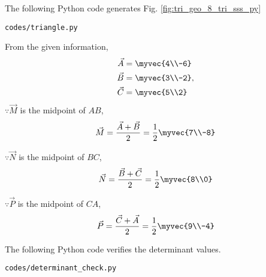 The  following Python code generates Fig. \ref{fig:tri_geo_8_tri_sss_py}
%
\begin{lstlisting}
codes/triangle.py
\end{lstlisting}
From the given information, 
\begin{align}
\label{eq:tri_geo_8_constr_a}
\vec{A} &= \myvec{4\\-6} 
\\
\vec{B} &= \myvec{3\\-2}, 
\label{eq:tri_geo_8_constr_b}
\\
\vec{C} &= \myvec{5\\2}
\label{eq:tri_geo_8_constr_c}
\end{align}
$\because \vec{M}$ is the midpoint of $AB$,
\begin{align}
\vec{M}= \frac{\vec{A}+\vec{B}}{2} = \frac{1}{2}\myvec{7\\-8}
\label{eq:tri_geo_8_constr_m}
\end{align}

$\because \vec{N}$ is the midpoint of $BC$,
\begin{align}
\vec{N}= \frac{\vec{B}+\vec{C}}{2} = \frac{1}{2}\myvec{8\\0}
\label{eq:tri_geo_8_constr_n}
\end{align}

$\because \vec{P}$ is the midpoint of $CA$,
\begin{align}
\vec{P}= \frac{\vec{C}+\vec{A}}{2} = \frac{1}{2}\myvec{9\\-4}
\label{eq:tri_geo_8_constr_p}
\end{align}

The  following Python code verifies the determinant values.

\begin{lstlisting}
codes/determinant_check.py
\end{lstlisting}

